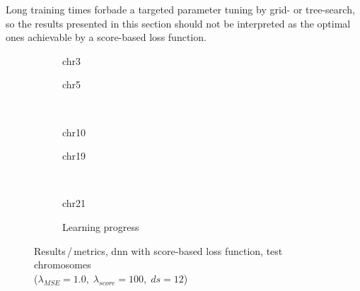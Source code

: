 Long training times forbade a targeted parameter tuning by grid- or tree-search,
so the results presented in this section should not be interpreted as the optimal ones achievable by a score-based loss function.
\begin{figure}[p]%
    \begin{subfigure}{0.45\textwidth}
        \scriptsize
        \caption{chr3}
    \end{subfigure} \hfill
    \begin{subfigure}{0.45\textwidth}
        \scriptsize
        \caption{chr5}
    \end{subfigure}\\[5mm]
    \begin{subfigure}{0.45\textwidth}
        \scriptsize
        \caption{chr10}
    \end{subfigure}\hfill
    \begin{subfigure}{0.45\textwidth}
        \scriptsize
        \caption{chr19}
    \end{subfigure}\\[3mm]
    \begin{subfigure}{0.45\textwidth}
        \scriptsize
        \caption{chr21}
    \end{subfigure}\hfill
    \begin{subfigure}{0.45\textwidth}
        \caption{Learning progress} \label{fig:results:scoreLossDNN_lossEpochs}
    \end{subfigure}
    \caption{Results\,/\,metrics, \acrshort{dnn} with score-based loss function, test chromosomes\\ ($\lambda_\mathit{MSE}=1.0,\; \lambda_\mathit{score}=100,\; ds=12$)} \label{fig:results:scoreLossDNN_pearson}
\end{figure}
